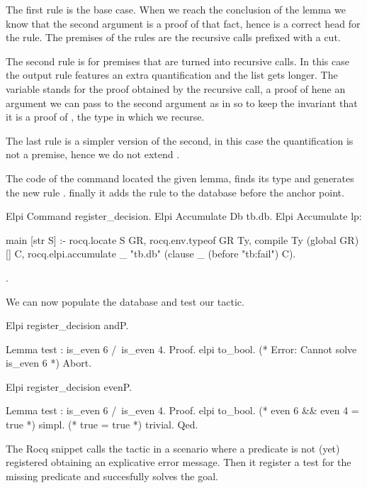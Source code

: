\documentclass[a4paper, 11pt]{book}
\begin{document}
The first rule is the base case. When we reach the conclusion of the lemma
 we know that the second argument 
is a proof of that fact, hence  is a correct head for the
rule. The premises of the rules are the  recursive calls
prefixed with a cut.

The second rule is for premises that are turned into recursive calls. In this
case the output rule features an extra  quantification and the
 list gets longer. The  variable stands for
the proof obtained by the recursive call, a proof of 
hene an argument we can pass to the second argument as in 
so to keep the invariant that it is a proof of , the type
in which we recurse.

The last rule is a simpler version of the second, in this case the quantification
is not a premise, hence we do not extend .

The code of the  command located the
given lemma, finds its type and generates the new rule .
finally it adds the rule to the database before the 
anchor point.

\begin{rocqcode}
Elpi Command register_decision.
Elpi Accumulate Db tb.db.
Elpi Accumulate lp:{{
    
main [str S] :-
  rocq.locate S GR,
  rocq.env.typeof GR Ty,
  compile Ty (global GR) [] C,
  rocq.elpi.accumulate _ "tb.db" (clause _ (before "tb:fail") C).

}}.
\end{rocqcode}

We can now populate the database and test our tactic.

\begin{rocqcode}
Elpi register_decision andP.

Lemma test : is_even 6 /\ is_even 4.
Proof.
elpi to_bool. (* Error: Cannot solve is_even 6 *)
Abort.

Elpi register_decision evenP.

Lemma test : is_even 6 /\ is_even 4.
Proof.
elpi to_bool. (* even 6 && even 4 = true *)
simpl.        (* true = true *)
trivial.
Qed.
\end{rocqcode}
  
The Rocq snippet calls the  tactic in a scenario
where a predicate is not (yet) registered obtaining an explicative
error message. Then it register a test for the missing predicate
and succesfully solves the goal.
\end{document}

